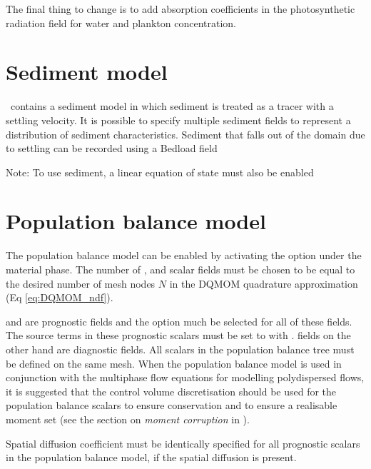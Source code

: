 The final thing to change is to add absorption coefficients in the photosynthetic radiation field for water and plankton concentration.

\section{Sediment model}
\label{config:sediments}

\fluidity\ contains a sediment model in which sediment is treated as a
tracer with a settling velocity.
It is possible to specify multiple sediment fields to represent a distribution of sediment
characteristics.
Sediment that falls out of the domain due to settling can be recorded using a
Bedload field

Note: To use sediment, a linear equation of state must also be enabled

\section{Population balance model}
\label{config:pbe}

The population balance model can be enabled by activating the  option under the material phase.
The number of ,  and  scalar fields must be chosen to be equal to the desired number of mesh nodes $N$ in the DQMOM quadrature approximation (Eq \eqref{eq:DQMOM_ndf}).

 and  are prognostic fields and the  option much be selected for all of these fields. The source terms in these prognostic scalars must be set to  with .  fields on the other hand are diagnostic fields. All scalars in the population balance tree must be defined on the same mesh. When the population balance model is used in conjunction with the multiphase flow equations for modelling polydispersed flows, it is suggested that the control volume discretisation should be used for the population balance scalars to ensure conservation and to ensure a realisable moment set (see the section on \emph{moment corruption} in \citet{bhutani2016}).

Spatial diffusion coefficient must be identically specified for all prognostic scalars in the population balance model, if the spatial diffusion is present.

